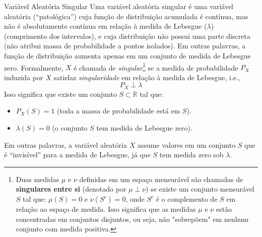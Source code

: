 %
\begin{frame}{Variável Aleatória Singular}
Uma variável aleatória singular é uma variável aleatória (``patológica'') cuja função de distribuição acumulada  é contínua, mas não é absolutamente contínua em relação à medida de Lebesgue ($\lambda$) (comprimento dos intervalos), e cuja distribuição não possui uma parte discreta (não atribui massa de probabilidade a pontos isolados). 
\bigskip
Em outras palavras, a função de distribuição aumenta apenas em um conjunto de medida de Lebesgue zero.	Formalmente,  \( X \) é chamada de {\it singular}\footnote{Duas medidas \( \mu \) e \( \nu \) definidas em um espaço mensurável são chamadas de {\bf singulares entre si} (denotado por \( \mu \perp \nu \)) se existe um conjunto mensurável \( S \) tal que:  \( \mu(S) = 0 \) e \( \nu(S^c) = 0 \), onde \( S^c \) é o complemento de \( S \) em relação ao espaço de medida. Isso significa que as medidas \( \mu \) e \( \nu \) estão concentradas em conjuntos disjuntos, ou seja, não "sobrepõem" em nenhum conjunto com medida positiva.} se a medida de probabilidade \( P_X \) induzida por \( X \) satisfaz {\it singularidade} em relação à medida de Lebesgue, i.e., 
\[
P_X \perp \lambda
\]
Isso significa que existe um conjunto \( S \subset \mathbb{R} \) tal que:

\begin{itemize} 
\item  \( P_X(S) = 1 \) (toda a massa de probabilidade está em \( S \)).
\item \( \lambda(S) = 0 \) (o conjunto \( S \) tem medida de Lebesgue zero).
\end{itemize}
Em outras palavras, a variável aleatória \( X \) assume valores em um conjunto \( S \) que é ``invisível'' para a medida de Lebesgue, já que \( S \) tem medida zero sob \( \lambda \).

\end{frame}	

